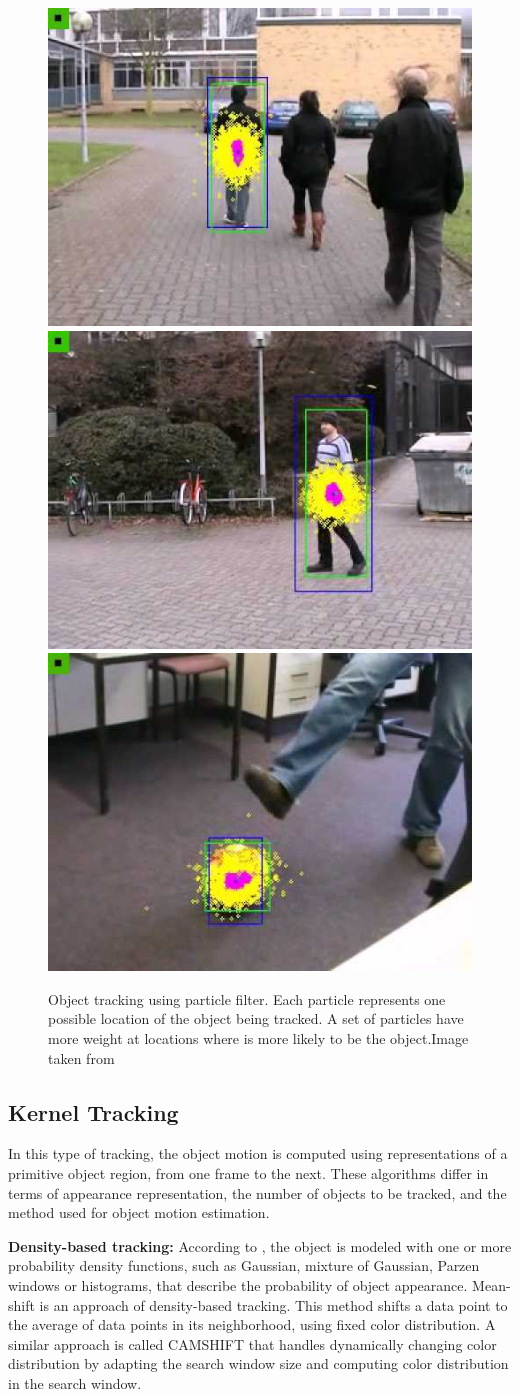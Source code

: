 \begin{figure}[t!!]
\centering
{
\includegraphics[width=0.32\linewidth]{Figures/particle_filter1.jpg}
\includegraphics[width=0.32\linewidth]{Figures/particle_filter2.jpg}
\includegraphics[width=0.32\linewidth]{Figures/particle_filter3.jpg}
}
\caption[Object tracking using particle filter]
		{Object tracking using particle filter. Each particle represents one
		possible location of the object being tracked. A set of particles have
		more weight at locations where is more likely to be the object.Image
		taken from \cite{Rittscher2000}}
\end{figure}


\subsection{Kernel Tracking}

In this type of tracking, the object motion is computed using representations
of a primitive object region, from one frame to the next. These algorithms
differ in terms of appearance representation, the number of objects to be
tracked, and the method used for object motion estimation. 

\textbf{Density-based tracking:} According to \cite{Cheng1995}, the object is
modeled with one or more probability density functions, such as
Gaussian, mixture of Gaussian, Parzen windows or histograms, that describe
the probability of object appearance. Mean-shift is an approach of density-based
tracking. This method shifts a data point to the average of data points
in its neighborhood, using fixed color distribution. A similar
approach is called CAMSHIFT \cite{Exner2010} that handles dynamically
changing color distribution by adapting the search window size
and computing color distribution in the search window.

